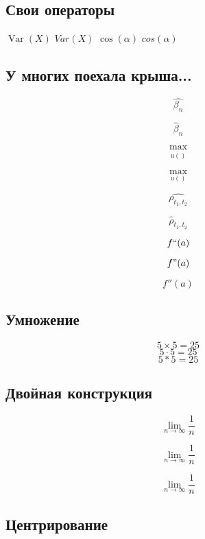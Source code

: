 \documentclass[12pt, a4paper]{article}
\DeclareMathOperator{\Var}{Var}
\begin{document}
\subsection{Свои операторы} 


$\Var(X)$  \hspace{5mm} $Var(X)$ \hspace{5mm} $\cos(\alpha)$  \hspace{5mm} $cos(\alpha)$

\subsection{У многих поехала крыша...}

\[ \hat{\beta_n} \]

\[ \hat{\beta}_n \]


\def \b{\hat{\beta}}

\[ \underset{\dot{ u()} }{\max} \]

\[ \underset{\dot{u}() }{\max} \]


\[ \hat{\rho_{t_1,t_2}} \]

\[ \hat\rho_{t_1,t_2} \]


\[ f``(a) \]   %

\[ f"(a) \]    %

\[ f''(a) \]   %

\subsection{Умножение} 

\[ 5 \times 5 = 25 \] 
\[ 5 \cdot 5 = 25 \] 
\[ 5 * 5 = 25 \] 

\subsection{Двойная конструкция}

\[ \textstyle \lim \limits_{n \to \infty} \frac{1}{n} \]

\[ \textstyle \lim_{n \to \infty} \frac{1}{n} \]

\[ \lim_{n \to \infty} \frac{1}{n} \]


\subsection{Центрирование}
\end{document}

